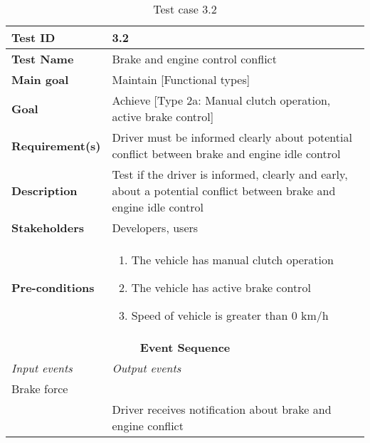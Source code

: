 \begin{table}[H]
\centering
\begin{tabularx}{\linewidth}{X|X}
  \hline
  \textbf{Test ID} & 3.2\\
  \hline
  \textbf{Test Name} &  Brake and engine control conflict\\
  \hline
  \textbf{Main goal} &  Maintain [Functional types]\\
  \hline
  \textbf{Goal} & Achieve [Type 2a: Manual clutch operation, active brake control] \\
  \hline
  \textbf{Requirement(s)} &  Driver must be informed clearly about potential conflict between brake and engine idle control\\
  \hline
  \textbf{Description} &  Test if the driver is informed, clearly and early, about a potential conflict between brake and engine idle control\\
  \hline
  \textbf{Stakeholders} &  Developers, users\\
  \hline
  \textbf{Pre-conditions} &  
  \begin{enumerate}
      \item The vehicle has manual clutch operation
      \item The vehicle has active brake control
      \item Speed of vehicle is greater than 0 km/h
  \end{enumerate}\\
  \hline
  \multicolumn{2}{c}{\textbf{Event Sequence}} \\
  \hline
  \textit{Input events} & \textit{Output events} \\
  \hline
   Brake force &  \\
  \hline
    & Driver receives notification about brake and engine conflict \\
  \hline
  \end{tabularx}
\caption{\label{tab_caseX} Test case 3.2}
\end{table}

